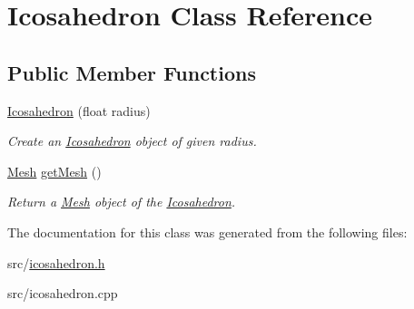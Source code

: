 \hypertarget{classIcosahedron}{}\section{Icosahedron Class Reference}
\label{classIcosahedron}
\subsection*{Public Member Functions}
\begin{DoxyCompactItemize}
\item 
\hyperlink{classIcosahedron_a372cbf992752c76c4a393b0a41980ad3}{Icosahedron} (float radius)\hypertarget{classIcosahedron_a372cbf992752c76c4a393b0a41980ad3}{}\label{classIcosahedron_a372cbf992752c76c4a393b0a41980ad3}

\begin{DoxyCompactList}\small\item\em Create an \hyperlink{classIcosahedron}{Icosahedron} object of given radius. \end{DoxyCompactList}\item 
\hyperlink{classMesh}{Mesh} \hyperlink{classIcosahedron_aad2072f6aaf58e56060e7117d5de8bd6}{get\+Mesh} ()\hypertarget{classIcosahedron_aad2072f6aaf58e56060e7117d5de8bd6}{}\label{classIcosahedron_aad2072f6aaf58e56060e7117d5de8bd6}

\begin{DoxyCompactList}\small\item\em Return a \hyperlink{classMesh}{Mesh} object of the \hyperlink{classIcosahedron}{Icosahedron}. \end{DoxyCompactList}\end{DoxyCompactItemize}


The documentation for this class was generated from the following files\+:\begin{DoxyCompactItemize}
\item 
src/\hyperlink{icosahedron_8h}{icosahedron.\+h}\item 
src/icosahedron.\+cpp\end{DoxyCompactItemize}
